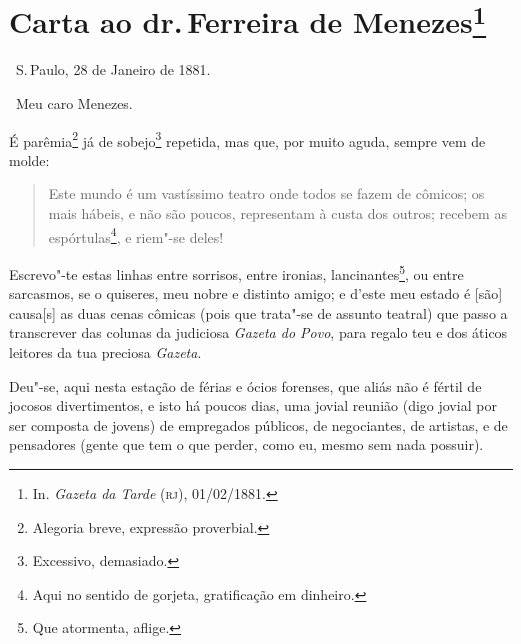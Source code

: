 \chapter{Carta ao dr.\,Ferreira de Menezes\footnote[*]{In.
  \emph{Gazeta da Tarde} (\textsc{rj}), 01/02/1881.}}

\hfill\ S.\,Paulo, 28 de Janeiro de 1881.\bigskip

\noindent\ Meu caro Menezes.\smallskip

É parêmia\footnote{Alegoria breve, expressão proverbial.} já de
sobejo\footnote{Excessivo, demasiado.} repetida, mas que, por muito
aguda, sempre vem de molde:

\begin{quote}
Este mundo é um vastíssimo teatro onde todos se fazem de cômicos; os
mais hábeis, e não são poucos, representam à custa dos outros; recebem
as espórtulas\footnote{Aqui no sentido de gorjeta, gratificação em
  dinheiro.}, e riem"-se deles!
\end{quote}

Escrevo"-te estas linhas entre sorrisos, entre ironias,
lancinantes\footnote{Que atormenta, aflige.}, ou entre sarcasmos, se o
quiseres, meu nobre e distinto amigo; e d'este meu estado é {[}são{]}
causa{[}s{]} as duas cenas cômicas (pois que trata"-se de assunto
teatral) que passo a transcrever das colunas da judiciosa \emph{Gazeta
do Povo}, para regalo teu e dos áticos leitores da tua preciosa
\emph{Gazeta}.

Deu"-se, aqui nesta estação de férias e ócios forenses, que aliás não é
fértil de jocosos divertimentos, e isto há poucos dias, uma jovial
reunião (digo jovial por ser composta de jovens) de empregados públicos,
de negociantes, de artistas, e de pensadores (gente que tem o que
perder, como eu, mesmo sem nada possuir).

